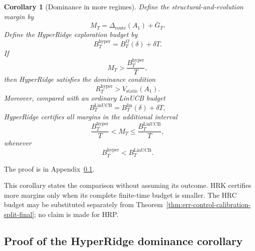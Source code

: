 \documentclass{article} %
\newtheorem{corollary}[theorem]{Corollary}
\begin{document}
\begin{corollary}[Dominance in more regimes]
\label{cor:hyper-dominance}
Define the structural-and-evolution margin by
\begin{equation}
\label{eq:hyper-margin}
M_T
=
\Delta_{\mathrm{route}}(A_1)+\bar G_T.
\end{equation}
Define the HyperRidge exploration budget by
\begin{equation}
\label{eq:hyper-budget}
B_T^{\mathrm{hyper}}
=
B_T^\Omega(\delta)+\delta T.
\end{equation}
If
\begin{equation}
\label{eq:hyper-dom-condition}
M_T
>
\frac{B_T^{\mathrm{hyper}}}{T},
\end{equation}
then HyperRidge satisfies the dominance condition
\begin{equation}
\label{eq:hyper-dom-reward}
R_T^{\mathrm{hyper}}
>
V_{\mathrm{static}}(A_1).
\end{equation}
Moreover, compared with an ordinary LinUCB budget
\begin{equation}
\label{eq:hyper-linucb-budget}
B_T^{\mathrm{LinUCB}}
=
B_T^{\mathrm{lin}}(\delta)+\delta T,
\end{equation}
HyperRidge certifies all margins in the additional interval
\begin{equation}
\label{eq:hyper-new-regime}
\frac{B_T^{\mathrm{hyper}}}{T}
<
M_T
\le
\frac{B_T^{\mathrm{LinUCB}}}{T},
\end{equation}
whenever
\begin{equation}
\label{eq:hyper-budget-order}
B_T^{\mathrm{hyper}}
<
B_T^{\mathrm{LinUCB}}.
\end{equation}
\end{corollary}

The proof is in Appendix~\ref{app:proof-hyper-dominance}.

This corollary states the comparison without assuming its outcome. HRK certifies more margins only when its complete finite-time budget is smaller. The HRC budget may be substituted separately from Theorem~\ref{thm:err-control-calibration-split-final}; no claim is made for HRP.

\subsection{Proof of the HyperRidge dominance corollary}
\label{app:proof-hyper-dominance}
\end{document}
